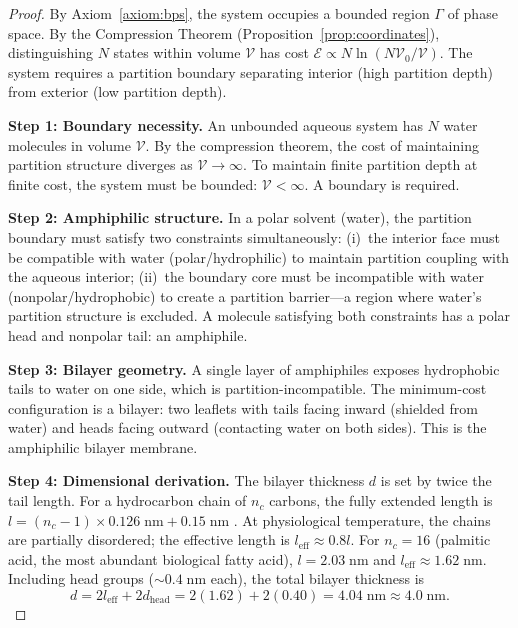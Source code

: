 \documentclass[twocolumn,10pt]{article}
\theoremstyle{remark}
\newcommand{\Cost}{\mathcal{E}}
\begin{document}
\begin{proof}
By Axiom~\ref{axiom:bps}, the system occupies a bounded region $\Gamma$ of phase space. By the Compression Theorem (Proposition~\ref{prop:coordinates}), distinguishing $N$ states within volume $\mathcal{V}$ has cost $\Cost \propto N \ln(N \mathcal{V}_0 / \mathcal{V})$. The system requires a partition boundary separating interior (high partition depth) from exterior (low partition depth).

\textbf{Step 1: Boundary necessity.} An unbounded aqueous system has $N$ water molecules in volume $\mathcal{V}$. By the compression theorem, the cost of maintaining partition structure diverges as $\mathcal{V} \to \infty$. To maintain finite partition depth at finite cost, the system must be bounded: $\mathcal{V} < \infty$. A boundary is required.

\textbf{Step 2: Amphiphilic structure.} In a polar solvent (water), the partition boundary must satisfy two constraints simultaneously: (i)~the interior face must be compatible with water (polar/hydrophilic) to maintain partition coupling with the aqueous interior; (ii)~the boundary core must be incompatible with water (nonpolar/hydrophobic) to create a partition barrier---a region where water's partition structure is excluded. A molecule satisfying both constraints has a polar head and nonpolar tail: an amphiphile.

\textbf{Step 3: Bilayer geometry.} A single layer of amphiphiles exposes hydrophobic tails to water on one side, which is partition-incompatible. The minimum-cost configuration is a bilayer: two leaflets with tails facing inward (shielded from water) and heads facing outward (contacting water on both sides). This is the amphiphilic bilayer membrane.

\textbf{Step 4: Dimensional derivation.} The bilayer thickness $d$ is set by twice the tail length. For a hydrocarbon chain of $n_c$ carbons, the fully extended length is $l = (n_c - 1) \times 0.126\;\mathrm{nm} + 0.15\;\mathrm{nm}$ \cite{israelachvili2011}. At physiological temperature, the chains are partially disordered; the effective length is $l_{\mathrm{eff}} \approx 0.8 l$. For $n_c = 16$ (palmitic acid, the most abundant biological fatty acid), $l = 2.03\;\mathrm{nm}$ and $l_{\mathrm{eff}} \approx 1.62\;\mathrm{nm}$. Including head groups ($\sim 0.4\;\mathrm{nm}$ each), the total bilayer thickness is
\begin{equation}
d = 2 l_{\mathrm{eff}} + 2 d_{\mathrm{head}} = 2(1.62) + 2(0.40) = 4.04\;\mathrm{nm} \approx 4.0\;\mathrm{nm}.
\label{eq:thickness}
\end{equation}


\end{proof}
\end{document}
